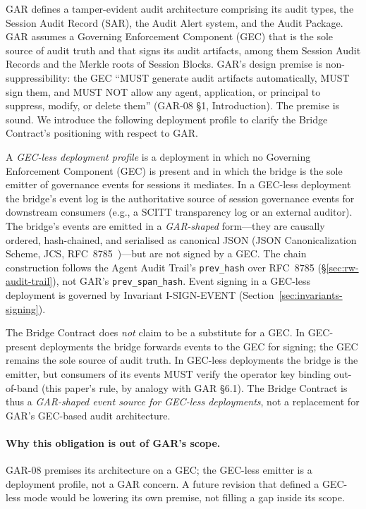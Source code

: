 GAR \cite{I-D.sato-soos-gar} defines a tamper-evident audit architecture
comprising its audit types, the Session Audit Record (SAR), the Audit
Alert system, and the Audit Package. GAR assumes a Governing Enforcement
Component (GEC) that is the sole source of audit truth and that signs
its audit artifacts, among them Session Audit Records and the Merkle
roots of Session Blocks.
GAR's design premise is non-suppressibility: the GEC ``MUST generate audit
artifacts automatically, MUST sign them, and MUST NOT allow any agent,
application, or principal to suppress, modify, or delete them''
(GAR-08 \S 1, Introduction). The premise is sound. We
introduce the following deployment profile to clarify the Bridge
Contract's positioning with respect to GAR.

\begin{definition}\label{def:gecless}
A \emph{GEC-less deployment profile} is a deployment in which no
Governing Enforcement Component (GEC) is present and in which the
bridge is the sole emitter of governance events for sessions it
mediates. In a GEC-less deployment the bridge's event log is the
authoritative source of session governance events for downstream
consumers (e.g., a SCITT transparency log or an external auditor).
The bridge's events are emitted in a \emph{GAR-shaped} form---they
are causally ordered, hash-chained, and serialised as canonical JSON
(JSON Canonicalization Scheme, JCS, RFC~8785~\cite{rundgren2020json})---but
are not signed by a GEC. The chain construction follows the Agent Audit
Trail's \texttt{prev\_hash} over RFC~8785 (\S\ref{sec:rw-audit-trail}),
not GAR's \texttt{prev\_span\_hash}. Event signing in a GEC-less deployment is governed
by Invariant I-SIGN-EVENT (Section~\ref{sec:invariants-signing}).
\end{definition}

The Bridge Contract does \emph{not} claim to be a substitute for a
GEC. In GEC-present deployments the bridge forwards events to the GEC
for signing; the GEC remains the sole source of audit truth. In
GEC-less deployments the bridge is the emitter, but consumers of its
events MUST verify the operator key binding out-of-band (this paper's
rule, by analogy with GAR \S 6.1). The Bridge Contract is thus a \emph{GAR-shaped event
source for GEC-less deployments}, not a replacement for GAR's GEC-based
audit architecture.

\paragraph{Why this obligation is out of GAR's scope.}
GAR-08 premises its architecture on a GEC; the GEC-less emitter is
a deployment profile, not a GAR concern. A future revision that
defined a GEC-less mode would be lowering its own premise, not
filling a gap inside its scope.

